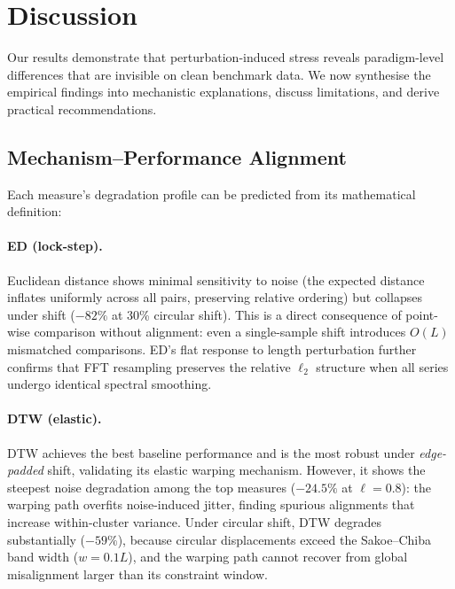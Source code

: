 
\section{Discussion}\label{sec:discussion}

Our results demonstrate that perturbation-induced stress reveals paradigm-level differences that are invisible on clean benchmark data.
We now synthesise the empirical findings into mechanistic explanations, discuss limitations, and derive practical recommendations.

\subsection{Mechanism--Performance Alignment}\label{sec:discuss-mechanism}

Each measure's degradation profile can be predicted from its mathematical definition:

\paragraph{ED (lock-step).}
Euclidean distance shows minimal sensitivity to noise (the expected distance inflates uniformly across all pairs, preserving relative ordering) but collapses under shift ($-82\%$ at 30\% circular shift).
This is a direct consequence of point-wise comparison without alignment: even a single-sample shift introduces $O(L)$ mismatched comparisons.
ED's flat response to length perturbation further confirms that FFT resampling preserves the relative $\ell_2$ structure when all series undergo identical spectral smoothing.

\paragraph{DTW (elastic).}
DTW achieves the best baseline performance and is the most robust under \emph{edge-padded} shift, validating its elastic warping mechanism.
However, it shows the steepest noise degradation among the top measures ($-24.5\%$ at $\ell = 0.8$): the warping path overfits noise-induced jitter, finding spurious alignments that increase within-cluster variance.
Under circular shift, DTW degrades substantially ($-59\%$), because circular displacements exceed the Sakoe--Chiba band width ($w = 0.1L$), and the warping path cannot recover from global misalignment larger than its constraint window.

